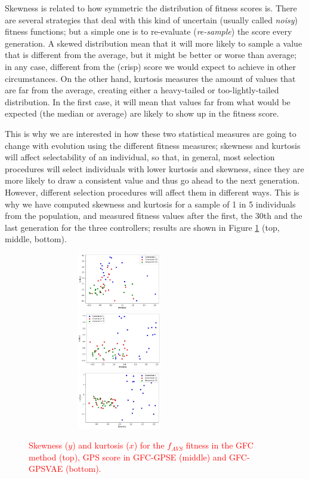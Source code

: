 \documentclass[10pt,journal,compsoc]{IEEEtran}
\begin{document}
Skewness is related to how symmetric the distribution of fitness
scores is. There are several strategies that deal with this kind of
uncertain (usually called {\em noisy}) fitness functions; but a simple
one is to re-evaluate ({\em re-sample}) the score every generation. A
skewed distribution mean that it will more likely to sample a value
that is different from the average, but it might be better or worse
than average; in any case, different from the (crisp) score we would expect to
achieve in other circumstances. On the other hand, kurtosis measures
the amount of values that are far from the average, creating either a
heavy-tailed or too-lightly-tailed distribution. In the first case, it
will mean that values far from what would be expected (the median or average) are likely to
show up in the fitness score.

This is why we are interested in how these two statistical measures
are going to change with evolution using the different fitness measures; skewness and kurtosis will  affect
selectability of an individual, so that, in general, most selection procedures will select
individuals with lower kurtosis and skewness, since they are more
likely to draw a consistent value and thus go ahead to the next
generation. However, different selection procedures will affect them in different ways. This is why we have computed skewness and kurtosis for a sample of 1 in 5 individuals from the population, and measured fitness values after the first, the 30th and the last generation for the three controllers;
results are shown in Figure \ref{fig:gfcsk} (top, middle, bottom). 

\begin{figure}[ht]	
	\begin{center}
          \includegraphics[width=8cm, height=2.5cm]{fig/GFC__.jpg}
          \includegraphics[width=8cm, height=2.5cm]{fig/GFCRSE__.jpg}
          \includegraphics[width=8cm, height=2.5cm]{fig/GFCVARSE__.jpg}
		\caption{\textcolor{red}{Skewness ($y$) and kurtosis ($x$)
                  for the $f_{AVS}$ fitness in the  {\sf GFC} method \cite{salem_cig2018} (top), GPS score in {\sf GFC-GPSE} (middle) and {\sf GFC-GPSVAE} (bottom).}}
		\label{fig:gfcsk}
	\end{center}	
\end{figure}
\end{document}
